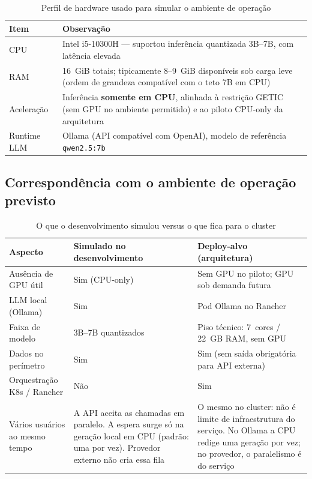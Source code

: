 \documentclass[12pt, a4paper]{article}
\begin{document}
\begin{table}[H]
\centering
\small
\caption{Perfil de hardware usado para simular o ambiente de operação}
\label{tab:hardware}
\begin{tabularx}{\textwidth}{l X}
\toprule
\textbf{Item} & \textbf{Observação} \\
\midrule
CPU & Intel i5-10300H --- suportou inferência quantizada 3B--7B, com latência elevada \\
RAM & 16~GiB totais; tipicamente 8--9~GiB disponíveis sob carga leve (ordem de grandeza compatível com o teto 7B em CPU) \\
Aceleração & Inferência \textbf{somente em CPU}, alinhada à restrição GETIC (sem GPU no ambiente permitido) e ao piloto CPU-only da arquitetura \\
Runtime LLM & Ollama (API compatível com OpenAI), modelo de referência \texttt{qwen2.5:7b} \\
\bottomrule
\end{tabularx}
\end{table}

\subsection{Correspondência com o ambiente de operação previsto}

\begin{table}[H]
\centering
\small
\caption{O que o desenvolvimento simulou versus o que fica para o cluster}
\label{tab:correspondencia}
\begin{tabularx}{\textwidth}{
  >{\raggedright\arraybackslash}p{4.2cm}
  >{\raggedright\arraybackslash}X
  >{\raggedright\arraybackslash}p{4.0cm}
}
\toprule
\textbf{Aspecto} & \textbf{Simulado no desenvolvimento} & \textbf{Deploy-alvo (arquitetura)} \\
\midrule
Ausência de GPU útil & Sim (CPU-only) & Sem GPU no piloto; GPU sob demanda futura \\
LLM local (Ollama) & Sim & Pod Ollama no Rancher \\
Faixa de modelo & 3B--7B quantizados & Piso técnico: 7~cores / 22~GB RAM, sem GPU \\
Dados no perímetro & Sim & Sim (sem saída obrigatória para API externa) \\
Orquestração K8s / Rancher & Não & Sim \\
Vários usuários ao mesmo tempo & A API aceita as chamadas em paralelo. A espera surge só na geração local em CPU (padrão: uma por vez). Provedor externo não cria essa fila & O mesmo no cluster: não é limite de infraestrutura do serviço. No Ollama a CPU redige uma geração por vez; no provedor, o paralelismo é do serviço \\
\bottomrule
\end{tabularx}
\end{table}
\end{document}
